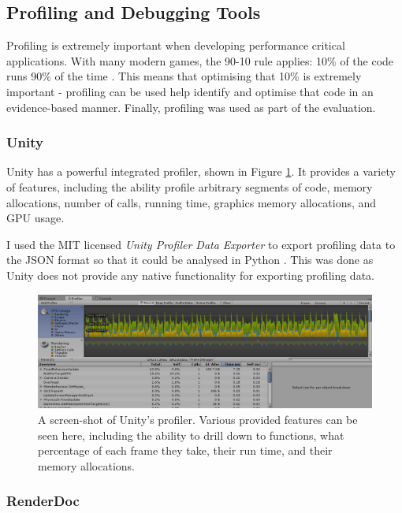 \documentclass[12pt,a4paper,twoside]{report}
\begin{document}
\subsection{Profiling and Debugging Tools}

Profiling is extremely important when developing performance critical
applications. With many modern games, the 90-10 rule applies: 10\% of the code
runs 90\% of the time \cite{gameenginebook}. This means that optimising that
10\% is extremely important - profiling can be used help identify and optimise
that code in an evidence-based manner. Finally, profiling was used as part of
the evaluation.

\subsubsection{Unity}

Unity has a powerful integrated profiler, shown in Figure \ref{fig:profiler}.
It provides a variety of features, including the ability profile arbitrary
segments of code, memory allocations, number of calls, running time, graphics
memory allocations, and GPU usage.

I used the MIT licensed \textit{Unity Profiler Data Exporter} to export
profiling data to the JSON format so that it could be analysed in Python
\cite{UnityProfilerDataExporter}. This was done as Unity does not provide any
native functionality for exporting profiling data.

\begin{figure}[h]
\centering
\includegraphics[width=0.8\linewidth]{profiler}
\caption{A screen-shot of Unity's profiler. Various provided features can be
seen here, including the ability to drill down to functions, what percentage of
each frame they take, their run time, and their memory allocations.}
\label{fig:profiler}
\end{figure}

\subsubsection{RenderDoc}
\end{document}
